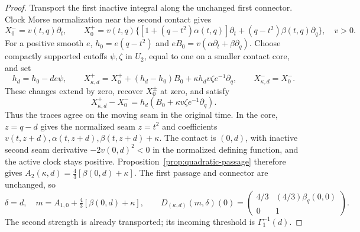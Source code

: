 \begin{proof}
Transport the first inactive integral along the unchanged first
connector. Clock Morse normalization near the second contact gives
\[
 X_0^-=v(t,q)\partial_t,\qquad
 X_0^+=v(t,q)\{[1+(q-t^2)\alpha(t,q)]\partial_t
                    +(q-t^2)\beta(t,q)\partial_q\},\quad v>0.
\]
For a positive smooth \(e\),
\(h_0=e(q-t^2)\) and
\(eB_0=v(\alpha\partial_t+\beta\partial_q)\).
Choose compactly supported cutoffs \(\psi,\zeta\) in \(U_2\),
equal to one on a smaller contact core, and set
\begin{equation}\label{eq:specified-contact-controls}
 h_d=h_0-de\psi,\qquad
 X_{\kappa,d}^+=X_0^++(h_d-h_0)B_0
                  +\kappa h_dv\zeta e^{-1}\partial_q,
 \qquad X_{\kappa,d}^-=X_0^-.
\end{equation}
These changes extend by zero, recover \(X_0^\pm\) at zero, and satisfy
\[
 X_{\kappa,d}^+-X_0^-
 =h_d(B_0+\kappa v\zeta e^{-1}\partial_q).
\]
Thus the traces agree on the moving seam in the original time.
In the core, \(z=q-d\) gives the normalized seam \(z=t^2\) and
coefficients \(v(t,z+d),\alpha(t,z+d),\beta(t,z+d)+\kappa\).
The contact is \((0,d)\), with inactive second seam derivative
\(-2v(0,d)^2<0\) in the normalized defining function, and the
active clock stays positive. Proposition~\ref{prop:quadratic-passage}
therefore gives \(A_2(\kappa,d)=\tfrac43[\beta(0,d)+\kappa]\).
The first passage and connector are unchanged, so
\begin{equation}\label{eq:specified-strength-jacobian}
 \delta=d,\quad m=A_{1,0}+\tfrac43[\beta(0,d)+\kappa],\qquad
 D_{(\kappa,d)}(m,\delta)(0)=
 \begin{pmatrix}4/3&(4/3)\beta_q(0,0)\\0&1\end{pmatrix}.
\end{equation}
The second strength is already transported; its incoming threshold is
\(\Gamma_1^{-1}(d)\).


\end{proof}
